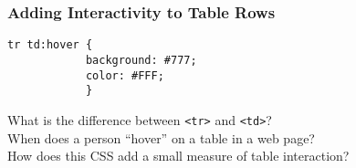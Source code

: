 \documentclass[14pt,aspectratio=169]{beamer}
\begin{document}
%
\begin{frame}[fragile]
  \frametitle{Adding Interactivity to Table Rows}
  \normalsize
  \hspace*{.25in}
  \begin{minipage}{6in}
    \vspace*{.2in}
    \begin{verbatim}
tr td:hover {
            background: #777;
            color: #FFF;
            }
    \end{verbatim}
  \end{minipage}
  \vspace*{.05in}
  \begin{center}
    \noindent What is the difference between {\tt <tr>} and {\tt <td>}?\\
    \noindent When does a person ``hover'' on a table in a web page?\\
    \noindent How does this CSS add a small measure of table interaction?\\
  \end{center}
\end{frame}
\end{document}
